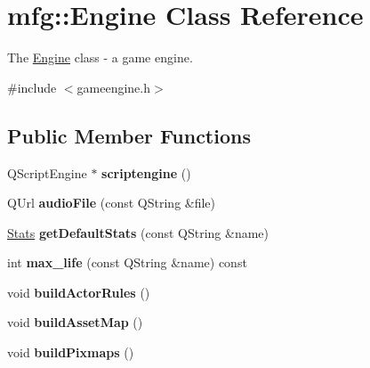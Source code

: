 \hypertarget{classmfg_1_1_engine}{}\section{mfg\+:\+:Engine Class Reference}
\label{classmfg_1_1_engine}


The \hyperlink{classmfg_1_1_engine}{Engine} class -\/ a game engine.  




{\ttfamily \#include $<$gameengine.\+h$>$}

\subsection*{Public Member Functions}
\begin{DoxyCompactItemize}
\item 
\mbox{\label{classmfg_1_1_engine_a687d0b7b9c5744312b52925cc365249e}} 
Q\+Script\+Engine $\ast$ {\bfseries scriptengine} ()
\item 
\mbox{\label{classmfg_1_1_engine_a70efe8bcf90b5ffc41cbf3e3e11f1e19}} 
Q\+Url {\bfseries audio\+File} (const Q\+String \&file)
\item 
\mbox{\label{classmfg_1_1_engine_a268d9d9bf7bed17b80c0bd22bffd4d8c}} 
\hyperlink{structmfg_1_1_stats}{Stats} {\bfseries get\+Default\+Stats} (const Q\+String \&name)
\item 
\mbox{\label{classmfg_1_1_engine_a64ff2b62c87bd742495c1bbd11c1dba5}} 
int {\bfseries max\+\_\+life} (const Q\+String \&name) const
\item 
\mbox{\label{classmfg_1_1_engine_a5618e671129e7689e59a139be9dd1c3a}} 
void {\bfseries build\+Actor\+Rules} ()
\item 
\mbox{\label{classmfg_1_1_engine_a54ac63e738b56fcebde8b938f6564d37}} 
void {\bfseries build\+Asset\+Map} ()
\item 
\mbox{\label{classmfg_1_1_engine_aab8b2f5a5ef432825a3973e839a24d78}} 
void {\bfseries build\+Pixmaps} ()
\item 
\mbox{\label{classmfg_1_1_engine_af0d7f38782bda7e1582ca7b8605fdd63}} 

\end{DoxyCompactItemize}
